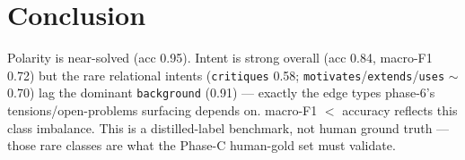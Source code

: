 \documentclass[11pt]{article}
\begin{document}
\section*{Conclusion}
Polarity is near-solved (acc 0.95). Intent is strong overall (acc 0.84, macro-F1 0.72) but the rare
relational intents (\texttt{critiques} 0.58; \texttt{motivates}/\texttt{extends}/\texttt{uses}
$\sim$0.70) lag the dominant \texttt{background} (0.91) --- exactly the edge types phase-6's
tensions/open-problems surfacing depends on. macro-F1 $<$ accuracy reflects this class imbalance.
This is a distilled-label benchmark, not human ground truth --- those rare classes are what the
Phase-C human-gold set must validate.
\end{document}
